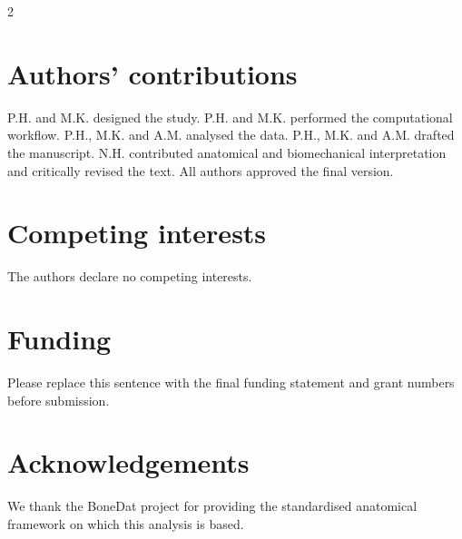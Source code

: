 \documentclass[openacc]{rsproca_new}
\begin{document}
\begin{multicols}{2}
\section*{Authors' contributions}

P.H. and M.K. designed the study. P.H. and M.K. performed the computational workflow. P.H., M.K. and A.M. analysed the data. P.H., M.K. and A.M. drafted the manuscript. N.H. contributed anatomical and biomechanical interpretation and critically revised the text. All authors approved the final version.

\section*{Competing interests}

The authors declare no competing interests.

\section*{Funding}

Please replace this sentence with the final funding statement and grant numbers before submission.

\section*{Acknowledgements}

We thank the BoneDat project for providing the standardised anatomical framework on which this analysis is based.

\end{multicols}
\end{document}
